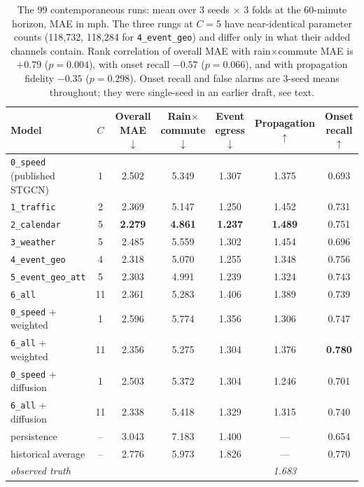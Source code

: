 \documentclass[letterpaper]{article}
\begin{document}
\begin{table}[t]
\centering
\small
\setlength{\tabcolsep}{4pt}
\begin{tabular}{@{}lcccccc@{}}
\toprule
Model & $C$ & Overall MAE $\downarrow$ & Rain$\times$commute $\downarrow$ & Event egress $\downarrow$ & Propagation $\uparrow$ & Onset recall $\uparrow$ \\
\midrule
\texttt{0\_speed} (published STGCN) & 1 & 2.502 & 5.349 & 1.307 & 1.375 & 0.693 \\
\texttt{1\_traffic}                 & 2 & 2.369 & 5.147 & 1.250 & 1.452 & 0.731 \\
\texttt{2\_calendar}                & 5 & \textbf{2.279} & \textbf{4.861} & \textbf{1.237} & \textbf{1.489} & 0.751 \\
\texttt{3\_weather}                 & 5 & 2.485 & 5.559 & 1.302 & 1.454 & 0.696 \\
\texttt{4\_event\_geo}              & 4 & 2.318 & 5.070 & 1.255 & 1.348 & 0.756 \\
\texttt{5\_event\_geo\_att}         & 5 & 2.303 & 4.991 & 1.239 & 1.324 & 0.743 \\
\texttt{6\_all}                     & 11 & 2.361 & 5.283 & 1.406 & 1.389 & 0.739 \\
\addlinespace
\texttt{0\_speed} + weighted        & 1 & 2.596 & 5.774 & 1.356 & 1.306 & 0.747 \\
\texttt{6\_all} + weighted          & 11 & 2.356 & 5.275 & 1.304 & 1.376 & \textbf{0.780} \\
\texttt{0\_speed} + diffusion       & 1 & 2.503 & 5.372 & 1.304 & 1.246 & 0.701 \\
\texttt{6\_all} + diffusion         & 11 & 2.338 & 5.418 & 1.329 & 1.315 & 0.740 \\
\addlinespace
persistence                         & -- & 3.043 & 7.183 & 1.400 & --- & 0.654 \\
historical average                  & -- & 2.776 & 5.973 & 1.826 & --- & 0.770 \\
\midrule
\emph{observed truth}               & & & & & \emph{1.683} & \\
\bottomrule
\end{tabular}
\caption{The 99 contemporaneous runs: mean over 3 seeds $\times$ 3 folds at the 60-minute horizon, MAE in mph. The three rungs at $C=5$ have near-identical parameter counts (118{,}732, 118{,}284 for \texttt{4\_event\_geo}) and differ only in what their added channels contain. Rank correlation of overall MAE with rain$\times$commute MAE is $+0.79$ ($p=0.004$), with onset recall $-0.57$ ($p=0.066$), and with propagation fidelity $-0.35$ ($p=0.298$). Onset recall and false alarms are 3-seed means throughout; they were single-seed in an earlier draft, see text.}
\label{tab:main}
\end{table}
\end{document}
